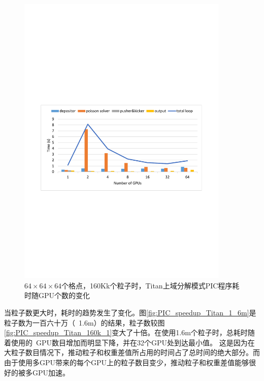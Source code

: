 \begin{figure}[!htb]
  \centering
  \includegraphics[width=0.9\textwidth]{Img/PIC_speedup_Titan_160k_2.pdf}
  \caption{$64 \times 64 \times 64$个格点，160Kk个粒子时，Titan上域分解模式PIC程序耗时随GPU个数的变化}
  \label{fig:PIC_speedup_Titan_160k_2}
\end{figure}

当粒子数更大时，耗时的趋势发生了变化。图\ref{fig:PIC_speedup_Titan_1_6m}是粒子数为一百六十万（~1.6m）的结果，粒子数较图\ref{fig:PIC_speedup_Titan_160k_1}变大了十倍。在使用1.6m个粒子时，总耗时随着使用的~GPU数目增加而明显下降，并在32个GPU处到达最小值。
这是因为在大粒子数目情况下，推动粒子和权重差值所占用的时间占了总时间的绝大部分。而由于使用多GPU带来的每个GPU上的粒子数目变少，推动粒子和权重差值能够很好的被多GPU加速。

